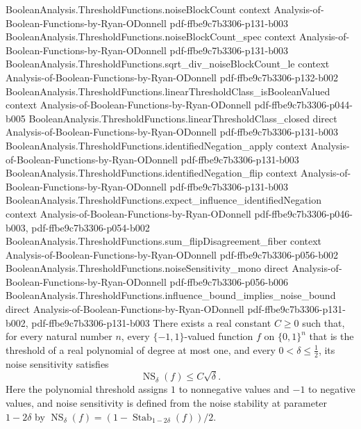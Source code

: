 \begin{theorem}
\proofstep
  {BooleanAnalysis.ThresholdFunctions.noiseBlockCount}
  {context}
  {Analysis-of-Boolean-Functions-by-Ryan-ODonnell}
  {pdf-ffbe9c7b3306-p131-b003}
\proofstep
  {BooleanAnalysis.ThresholdFunctions.noiseBlockCount_spec}
  {context}
  {Analysis-of-Boolean-Functions-by-Ryan-ODonnell}
  {pdf-ffbe9c7b3306-p131-b003}
\proofstep
  {BooleanAnalysis.ThresholdFunctions.sqrt_div_noiseBlockCount_le}
  {context}
  {Analysis-of-Boolean-Functions-by-Ryan-ODonnell}
  {pdf-ffbe9c7b3306-p132-b002}
\proofstep
  {BooleanAnalysis.ThresholdFunctions.linearThresholdClass_isBooleanValued}
  {context}
  {Analysis-of-Boolean-Functions-by-Ryan-ODonnell}
  {pdf-ffbe9c7b3306-p044-b005}
\proofstep
  {BooleanAnalysis.ThresholdFunctions.linearThresholdClass_closed}
  {direct}
  {Analysis-of-Boolean-Functions-by-Ryan-ODonnell}
  {pdf-ffbe9c7b3306-p131-b003}
\proofstep
  {BooleanAnalysis.ThresholdFunctions.identifiedNegation_apply}
  {context}
  {Analysis-of-Boolean-Functions-by-Ryan-ODonnell}
  {pdf-ffbe9c7b3306-p131-b003}
\proofstep
  {BooleanAnalysis.ThresholdFunctions.identifiedNegation_flip}
  {context}
  {Analysis-of-Boolean-Functions-by-Ryan-ODonnell}
  {pdf-ffbe9c7b3306-p131-b003}
\proofstep
  {BooleanAnalysis.ThresholdFunctions.expect_influence_identifiedNegation}
  {context}
  {Analysis-of-Boolean-Functions-by-Ryan-ODonnell}
  {pdf-ffbe9c7b3306-p046-b003,
    pdf-ffbe9c7b3306-p054-b002}
\proofstep
  {BooleanAnalysis.ThresholdFunctions.sum_flipDisagreement_fiber}
  {context}
  {Analysis-of-Boolean-Functions-by-Ryan-ODonnell}
  {pdf-ffbe9c7b3306-p056-b002}
\proofstep
  {BooleanAnalysis.ThresholdFunctions.noiseSensitivity_mono}
  {direct}
  {Analysis-of-Boolean-Functions-by-Ryan-ODonnell}
  {pdf-ffbe9c7b3306-p056-b006}
\proofstep
  {BooleanAnalysis.ThresholdFunctions.influence_bound_implies_noise_bound}
  {direct}
  {Analysis-of-Boolean-Functions-by-Ryan-ODonnell}
  {pdf-ffbe9c7b3306-p131-b002,
    pdf-ffbe9c7b3306-p131-b003}
There exists a real constant $C\ge0$ such that, for every natural number $n$, every
$\{-1,1\}$-valued function $f$ on $\{0,1\}^n$ that is the threshold of a real polynomial
of degree at most one, and every $0<\delta\le\tfrac12$, its noise sensitivity satisfies
\[
\operatorname{NS}_\delta(f)\le C\sqrt{\delta}.
\]
Here the polynomial threshold assigns $1$ to nonnegative values and $-1$ to negative
values, and noise sensitivity is defined from the noise stability at parameter
$1-2\delta$ by $\operatorname{NS}_\delta(f)=(1-\operatorname{Stab}_{1-2\delta}(f))/2$.
\end{theorem}


